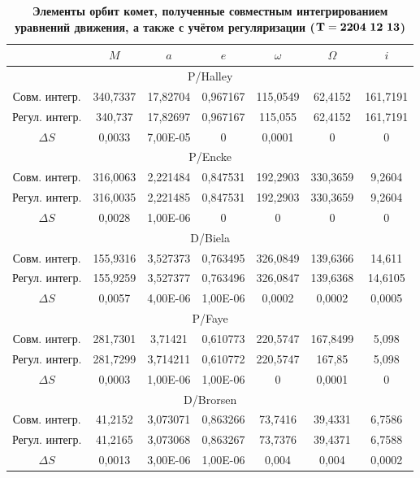 \begin{table}[p!]
\centering
\begin{minipage}[t]{128mm} \centering\small
\caption{\bf Элементы орбит комет, полученные совместным интегрированием уравнений движения, а также с учётом регуляризации  ($\bf T=2204\ 12\ 13$) \vspace{-3mm}} \footnotesize
\begin{tabular}{c|c|c|c|c|c|c}
\hline
 &   $M$  &   $a$  &   $e$  &   $\omega$&   $\Omega$  &   $i$    \\ \hline
\multicolumn{7}{c}{P/Halley	}	\\	\hline
Совм. интегр.	&	340,7337	&	17,82704	&	0,967167	&	115,0549	&	62,4152	&	161,7191	\\
Регул. интегр.	&	340,737	&	17,82697	&	0,967167	&	115,055	&	62,4152	&	161,7191	\\
$\Delta S$	&	0,0033	&	7,00E-05	&	0	&	0,0001	&	0	&	0	\\	\hline
\multicolumn{7}{c}{P/Encke	}	\\	\hline
Совм. интегр.	&	316,0063	&	2,221484	&	0,847531	&	192,2903	&	330,3659	&	9,2604	\\
Регул. интегр.	&	316,0035	&	2,221485	&	0,847531	&	192,2903	&	330,3659	&	9,2604	\\
$\Delta S$	&	0,0028	&	1,00E-06	&	0	&	0	&	0	&	0	\\	\hline
\multicolumn{7}{c}{D/Biela	}	\\	\hline
Совм. интегр.	&	155,9316	&	3,527373	&	0,763495	&	326,0849	&	139,6366	&	14,611	\\
Регул. интегр.	&	155,9259	&	3,527377	&	0,763496	&	326,0847	&	139,6368	&	14,6105	\\
$\Delta S$	&	0,0057	&	4,00E-06	&	1,00E-06	&	0,0002	&	0,0002	&	0,0005	\\	\hline
\multicolumn{7}{c}{P/Faye	}	\\	\hline
Совм. интегр.	&	281,7301	&	3,71421	&	0,610773	&	220,5747	&	167,8499	&	5,098	\\
Регул. интегр.	&	281,7299	&	3,714211	&	0,610772	&	220,5747	&	167,85	&	5,098	\\
$\Delta S$	&	0,0003	&	1,00E-06	&	1,00E-06	&	0	&	0,0001	&	0	\\	\hline
\multicolumn{7}{c}{D/Brorsen}	\\	\hline
Совм. интегр.	&	41,2152	&	3,073071	&	0,863266	&	73,7416	&	39,4331	&	6,7586	\\
Регул. интегр.	&	41,2165	&	3,073068	&	0,863267	&	73,7376	&	39,4371	&	6,7588	\\
$\Delta S$	&	0,0013	&	3,00E-06	&	1,00E-06	&	0,004	&	0,004	&	0,0002	\\	\hline

\end{tabular}
\end{minipage}
\end{table}
